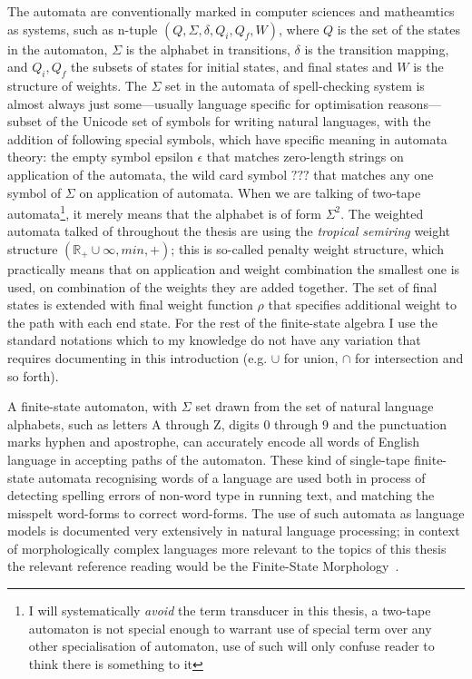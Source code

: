 \documentclass[officiallayout,draft]{unihelcompling}
\begin{document}
The automata are conventionally marked in computer sciences and matheamtics as
systems, such as n-tuple $(Q, \Sigma, \delta, Q_i, Q_f, W)$, where $Q$ is the
set of the states in the automaton, $\Sigma$ is the alphabet in transitions,
$\delta$ is the transition mapping, and $Q_i, Q_f$ the subsets of states for
initial states, and final states and $W$ is the structure of weights. The
$\Sigma$ set in the automata of spell-checking system is almost always just
some---usually language specific for optimisation reasons---subset of the
Unicode set of symbols for writing natural languages, with the addition of
following special symbols, which have specific meaning in automata theory: the
empty symbol epsilon $\epsilon$ that matches zero-length strings on application
of the automata, the wild card symbol $???$ that matches any one symbol of $\Sigma$ on application of automata.  When
we are talking of two-tape automata\footnote{I will systematically \emph{avoid}
    the term transducer in this thesis, a two-tape automaton is not special
enough to warrant use of special term over any other specialisation of
automaton, use of such will only confuse reader to think there is something to
it}, it merely means that the alphabet is of form $\Sigma^2$. The weighted
automata talked of throughout the thesis are using the \emph{tropical semiring}
weight structure $(\mathbb{R}_+ \cup \infty, min, +)$; this is so-called
penalty weight structure, which practically means that on application and
weight combination the smallest one is used, on combination of the weights they
are added together. The set of final states is extended with final weight
function $\rho$ that specifies additional weight to the path with each end 
state. For the rest of the finite-state algebra I use the standard notations
which to my knowledge do not have any variation that requires documenting in
this introduction (e.g. $\cup$ for union, $\cap$ for intersection and so forth).

A finite-state automaton, with $\Sigma$ set drawn from the set of natural
language alphabets, such as letters A through Z, digits 0 through 9 and the
punctuation marks hyphen and apostrophe, can accurately encode all words of
English language in accepting paths of the automaton. These kind of single-tape
finite-state automata recognising words of a language are used both in process
of detecting spelling errors of non-word type in running text, and matching
the misspelt word-forms to correct word-forms. The use of such automata as
language models is documented very extensively in natural language processing;
in context of morphologically complex languages more relevant to the topics of
this thesis the relevant reference reading would be the Finite-State Morphology~\cite{beesley2003finite,beesley2004morphological}.
\end{document}
